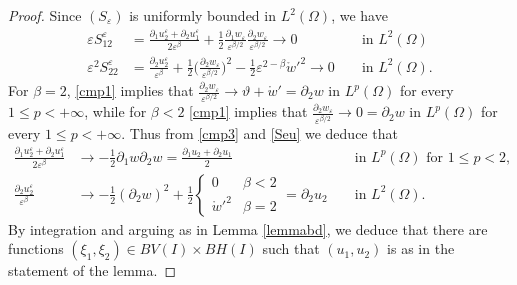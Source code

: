 \documentclass[a4, 11pt, reqno, final]{amsart}
\newcommand\e{\varepsilon}
\theoremstyle{plain}%
\newcommand{\QED}{\hspace{1ex}\hfill$\blacksquare$\vspace{2ex}}
\begin{document}
\begin{proof}
		Since $(S_\e)$ is uniformly bounded in $L^2(\Omega)$, we have
		\begin{equation}\label{Seu}
			\begin{aligned}
				\e S_{12}^\e&=\frac{\partial_1 u_2^\e + \partial_2 u_1^\e}{2\e^\beta}+ \frac12 \frac{\partial_1 w_\e}{\e^{\beta/2}}\frac{\partial_2 w_\e}{\e^{\beta/2}}\to 0 && \text{ in } L^2(\Omega)\\
				\e^2 S_{22}^\e&=\frac{\partial_2 u_2^\e}{\e^\beta} + \frac12 \big(\frac{\partial_2 w_\e}{\e^{\beta/2}}\big)^2- \frac12\e^{2-\beta} \mathring{w}'^2\to 0 && \text{ in } L^2(\Omega).
			\end{aligned}
		\end{equation}
		For $\beta=2$, \eqref{cmp1} implies that $\frac{\partial_2 w_\e}{\e^{\beta/2}}\to \vartheta+\mathring{w}'=\partial_2 w$ in $L^p(\Omega)$ for every $1\le p<+\infty$, while
		for $\beta < 2$ \eqref{cmp1} implies that $\frac{\partial_2 w_\e}{\e^{\beta/2}}\to 0=\partial_2 w$ in $L^p(\Omega)$ for every $1\le p<+\infty$. Thus from \eqref{cmp3} and \eqref{Seu} we deduce that
		$$ \begin{aligned}
			\frac{\partial_1 u_2^\e + \partial_2 u_1^\e}{2\e^\beta} &\to -\frac12\partial_1 w\partial_2 w=\frac{\partial_1 u_2 + \partial_2 u_1}{2}  && \text{ in } L^p(\Omega)\text{ for }1\le p <2,\\
			\frac{\partial_2 u_2^\e}{\e^\beta} &\to - \frac12(\partial_2 w)^2 + \frac12\begin{cases}
				0 & \beta < 2\\
				\mathring{w}'^2 & \beta=2
			\end{cases}=\partial_2 u_2
			&& \text{ in } L^2(\Omega).
		\end{aligned}$$
		By integration and arguing as in Lemma \ref{lemmabd}, we deduce that there are functions $(\xi_1, \xi_2) \in BV(I)\times BH(I)$ such that $(u_1, u_2)$ is as in the statement of the lemma.
	\end{proof}
\end{document}

